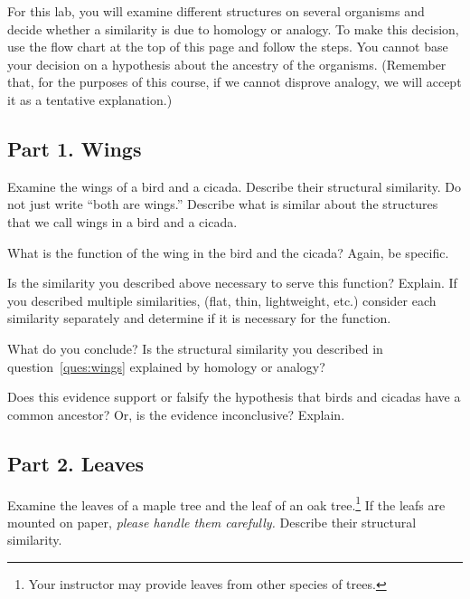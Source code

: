 \documentclass[12pt, hidelinks]{exam}
\newcommand*\AnswerBox[2]{%
    \parbox[t][#1]{0.92\textwidth}{%
    \begin{solution}#2\end{solution}}
}
\begin{document}
For this lab, you will examine different structures on several organisms and decide whether a similarity is due to homology or analogy. To make this decision, use the flow chart at
the top of this page and follow the steps. You cannot base your decision on a hypothesis about the ancestry of the organisms. (Remember that, for the
purposes of this course, if we cannot disprove analogy, we will accept it
as a tentative explanation.)


\subsection*{Part 1. Wings}

\begin{questions}

\question[1]\label{ques:wings}
Examine the wings of a bird and a cicada. Describe their structural
similarity. Do not just write ``both are wings.''  Describe what is similar about the
structures that we call wings in a bird and a cicada.

\AnswerBox{3\baselineskip}{}

\question[1]
What is the function of the wing in the bird and the cicada? Again, be specific.

\AnswerBox{3\baselineskip}{}

\question[1]
Is the similarity you described above necessary to serve
this function? Explain. If you described multiple similarities,
(flat, thin, lightweight, etc.) consider each similarity separately
and determine if it is necessary for the function.

\AnswerBox{3\baselineskip}{}

\question[1]
What do you conclude? Is the structural similarity you described in
question~\ref{ques:wings} explained by homology or analogy?

\newpage

\question[1]
Does this evidence support or falsify the hypothesis that birds and
cicadas have a common ancestor? Or, is the evidence inconclusive?
Explain.

\AnswerBox{3\baselineskip}{}

\subsection*{Part 2. Leaves}

\question[1]\label{ques:leaf}
Examine the leaves of a maple tree and the leaf of
an oak tree.\footnote{Your instructor may provide leaves from other species of trees.} If the leafs are mounted on paper, \emph{please
handle them carefully.} Describe their structural similarity.


\end{questions}
\end{document}
